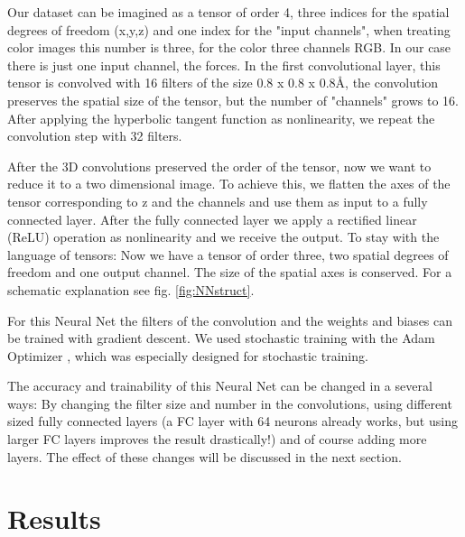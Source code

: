 \documentclass{article}
\begin{document}
Our dataset can be imagined as a tensor of order 4, three indices for the spatial degrees of freedom (x,y,z) and one index for the "input channels", when treating color images this number is three, for the color three channels RGB. In our case there is just one input channel, the forces. In the first convolutional layer, this tensor is convolved with 16 filters of the size 0.8 x 0.8 x 0.8{\AA}, the convolution preserves the spatial size of the tensor, but the number of "channels" grows to 16. After applying the hyperbolic tangent function as nonlinearity, we repeat the convolution step with 32 filters.

After the 3D convolutions preserved the order of the tensor, now we want to reduce it to a two dimensional image. To achieve this, we flatten the axes of the tensor corresponding to z and the channels and use them as input to a fully connected layer. After the fully connected layer we apply a rectified linear (ReLU) operation as nonlinearity and we receive the output. To stay with the language of tensors: Now we have a tensor of order three, two spatial degrees of freedom and one output channel. The size of the spatial axes is conserved. For a schematic explanation see fig. \ref{fig:NNstruct}.

For this Neural Net the filters of the convolution and the weights and biases can be trained with gradient descent. We used stochastic training with the Adam Optimizer \cite{kingma2014adam}, which was especially designed for stochastic training. 

The accuracy and trainability of this Neural Net can be changed in a several ways: By changing the filter size and number in the convolutions, using different sized fully connected layers (a FC layer with 64 neurons already works, but using larger FC layers improves the result drastically!) and of course adding more layers. The effect of these changes will be discussed in the next section.


\newpage
\section{Results}



\end{document}
